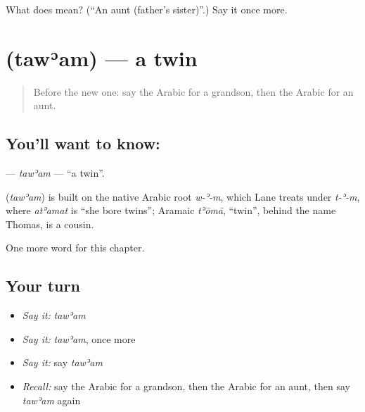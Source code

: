 \begin{tcolorbox}[breakable,colback=teal!4,colframe=teal!35!black,title={Before you move on}]
What does  mean? (\textquotedblleft{}An aunt (father's sister)\textquotedblright{}.) Say it once more.
\end{tcolorbox}
\section[\texorpdfstring{\ar{توأم} (tawʾam)}{توأم (tawʾam)}]{ (tawʾam) — a twin}

\label{lesson:AR-C246-tawam}



\begin{quote}
Before the new one: say the Arabic for a grandson, then the Arabic for an aunt.
\end{quote}

\subsection*{You'll want to know: }
\textbf{} — \emph{tawʾam} — \textquotedblleft{}a twin\textquotedblright{}.

\begin{cousinweb}
\textbf{} (\emph{tawʾam}) is built on the native Arabic root \emph{w-ʾ-m}, which Lane treats under \emph{t-ʾ-m}, where \emph{atʾamat} is \textquotedblleft{}she bore twins\textquotedblright{}; Aramaic \emph{tʾōmā}, \textquotedblleft{}twin\textquotedblright{}, behind the name Thomas, is a cousin.
\end{cousinweb}

\begin{grammarlens}[title={What you've built}]
One more word for this chapter.
\end{grammarlens}

\subsection*{Your turn}
\begin{itemize}
\raggedright
  \item \emph{Say it:} \emph{tawʾam}
  \item \emph{Say it:} \emph{tawʾam}, once more
  \item \emph{Say it:} say \emph{tawʾam}
  \item \emph{Recall:} say the Arabic for a grandson, then the Arabic for an aunt, then say \emph{tawʾam} again
\end{itemize}

